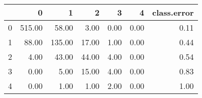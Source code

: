 \begin{table}[ht]
\centering
\begin{tabular}{rrrrrrr}
  \hline
 & 0 & 1 & 2 & 3 & 4 & class.error \\ 
  \hline
0 & 515.00 & 58.00 & 3.00 & 0.00 & 0.00 & 0.11 \\ 
  1 & 88.00 & 135.00 & 17.00 & 1.00 & 0.00 & 0.44 \\ 
  2 & 4.00 & 43.00 & 44.00 & 4.00 & 0.00 & 0.54 \\ 
  3 & 0.00 & 5.00 & 15.00 & 4.00 & 0.00 & 0.83 \\ 
  4 & 0.00 & 1.00 & 1.00 & 2.00 & 0.00 & 1.00 \\ 
   \hline
\end{tabular}
\end{table}
